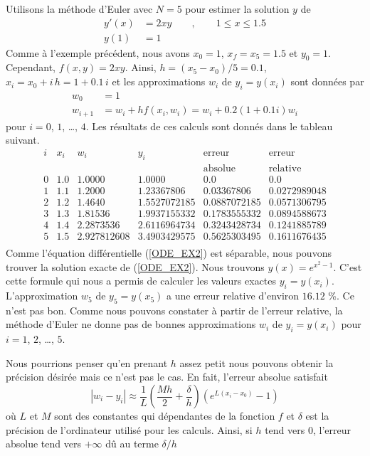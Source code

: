 {\begin{egg}
Utilisons la méthode d'Euler avec $N=5$ pour estimer la solution $y$ de
\begin{equation}\label{ODE_EX2}
\begin{split}
y'(x) & =  2xy \qquad , \qquad 1 \leq x \leq 1.5 \\
y(1) & =  1
\end{split}
\end{equation}
Comme à l'exemple précédent, nous avons $x_0=1$, $x_f= x_5 =1.5$ et $y_0=1$.
Cependant, $f(x,y) = 2xy$.  Ainsi, $h = (x_5-x_0)/5 = 0.1$,
$x_i = x_0 + i\,h =1 + 0.1\,i$ et les approximations $w_i$ de
$y_i = y(x_i)$ sont données par
\begin{align*}
w_0 & = 1 \\
w_{i+1} & = w_i + h f(x_i,w_i) = w_i + 0.2 (1+0.1i) w_i
\end{align*}
pour $i=0$, $1$, \ldots, $4$.  Les résultats de ces calculs sont
donnés dans le tableau suivant.
\[
\begin{array}{c|l|l|l|l|l}
i & x_i & w_i & y_i & \text{erreur} & \text{erreur} \\
 & & & & \text{absolue} & \text{relative} \\
\hline
0 & 1.0 & 1.0000 & 1.0000 & 0.0 & 0.0 \\
1 & 1.1 & 1.2000 & 1.23367806 & 0.03367806 & 0.0272989048 \\
2 & 1.2 & 1.4640 & 1.5527072185 & 0.0887072185 & 0.0571306795 \\
3 & 1.3 & 1.81536 & 1.9937155332 & 0.1783555332 & 0.0894588673 \\
4 & 1.4 & 2.2873536 & 2.6116964734 & 0.3243428734 & 0.1241885789 \\
5 & 1.5 & 2.927812608 & 3.4903429575 & 0.5625303495 & 0.1611676435 \\
\end{array}
\]
Comme l'équation différentielle (\ref{ODE_EX2}) est séparable, nous pouvons
trouver la solution exacte de (\ref{ODE_EX2}).  Nous trouvons
$y(x) = e^{x^2 -1}$.  C'est cette formule qui nous a permis de
calculer les valeurs exactes $y_i = y(x_i)$.  L'approximation $w_5$ de
$y_5 = y(x_5)$ a une erreur relative d'environ $16.12$ \%.  Ce n'est
pas bon.  Comme nous pouvons constater à partir de l'erreur relative, la
méthode d'Euler ne donne pas de bonnes approximations $w_i$ de
$y_i = y(x_i)$ pour $i=1$, $2$, \ldots, $5$.
\label{Euler_EX2}
\end{egg}

\begin{rmk}
Nous pourrions penser qu'en prenant $h$ assez petit nous pouvons obtenir la
précision désirée mais ce n'est pas le cas. En fait, l'erreur absolue
satisfait
\[
|w_i-y_i| \approx \frac{1}{L}\left(\frac{Mh}{2}
+ \frac{\delta}{h} \right)\left( e^{L(x_i-x_0)} - 1 \right)
\]
où $L$ et $M$ sont des constantes qui dépendantes de la fonction $f$
et $\delta$ est la précision de l'ordinateur utilisé pour les calculs.
Ainsi, si $h$ tend vers $0$, l'erreur absolue tend vers $+\infty$ dû
au terme $\delta/h$
\end{rmk}

}
